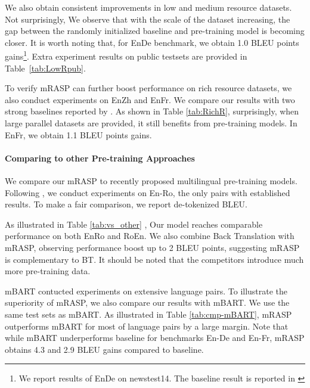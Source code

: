\documentclass[11pt,a4paper]{article}
\newcommand{\method}{mRASP\xspace}
\begin{document}
We also obtain consistent improvements in low and medium resource datasets. Not surprisingly, We observe that with the scale of the dataset increasing, the gap between the randomly initialized baseline and pre-training model is becoming closer. It is worth noting that, for EnDe benchmark, we obtain 1.0 BLEU points gains\footnote{We report results of EnDe on newstest14. The baseline result is reported in \citet{DBLP:conf/wmt/OttEGA18}}. Extra experiment results on public testsets are provided in Table~\ref{tab:LowRpub}.


To verify \method can further boost performance on rich resource datasets, we also conduct experiments on EnZh and EnFr. We compare our results with two strong baselines reported by \citet{DBLP:conf/wmt/OttEGA18, DBLP:conf/wmt/LiLXLLLWZXWFCLL19}. As shown in Table \ref{tab:RichR}, surprisingly, when large parallel datasets are provided, it still benefits from pre-training models. In EnFr, we obtain 1.1 BLEU points gains. 


\paragraph{Comparing to other Pre-training Approaches}
We compare our \method to recently proposed multilingual pre-training models. Following \citet{DBLP:journals/corr/abs-2001-08210}, we conduct experiments on En-Ro, the only pairs with established results. To make a fair comparison, we report de-tokenized BLEU.

As illustrated in Table \ref{tab:vs_other} , Our model reaches comparable performance on both EnRo and RoEn. We also combine Back Translation \cite{DBLP:conf/acl/SennrichHB16} with  \method, observing performance boost up to 2 BLEU points, suggesting \method is complementary to BT. It should be noted that the competitors introduce much more pre-training data.

mBART contucted experiments on extensive language pairs. To illustrate the superiority of \method, we also compare our results with mBART. We use the same test sets as mBART. As illustrated in Table \ref{tab:cmp-mBART}, mRASP outperforms mBART for most of language pairs by a large margin. Note that while mBART underperforms baseline for benchmarks En-De and En-Fr, \method obtains 4.3 and 2.9 BLEU gains compared to baseline.
\end{document}
